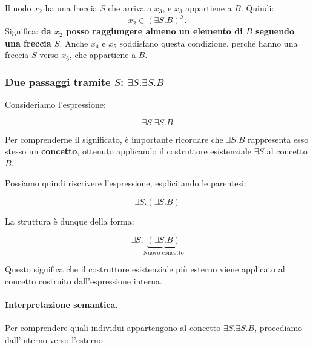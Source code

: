 Il nodo \(x_2\) ha una freccia \(S\) che arriva a \(x_3\), e \(x_3\)
appartiene a \(B\). Quindi:
\[
    x_2\in(\exists S.B)^{\mathcal I}.
\]
Significa: \textbf{da \(x_2\) posso raggiungere almeno un elemento di \(B\)
seguendo una freccia \(S\)}. Anche \(x_4\) e \(x_5\) soddisfano questa
condizione, perché hanno una freccia \(S\) verso \(x_6\), che appartiene a \(B\).

\subsubsection{Due passaggi tramite $S$: $\exists S.\exists S.B$}

Consideriamo l'espressione:

\[
\exists S.\exists S.B
\]

Per comprenderne il significato, è importante ricordare che
$\exists S.B$ rappresenta esso stesso un \textbf{concetto},
ottenuto applicando il costruttore esistenziale $\exists S$
al concetto $B$.

Possiamo quindi riscrivere l'espressione, esplicitando
le parentesi:

\[
\exists S.(\exists S.B)
\]

La struttura è dunque della forma:

\[
\exists S.\underbrace{(\exists S.B)}_{\text{Nuovo concetto}}
\]

Questo significa che il costruttore esistenziale più esterno
viene applicato al concetto costruito dall'espressione interna.

\paragraph{Interpretazione semantica.}

Per comprendere quali individui appartengono al concetto
$\exists S.\exists S.B$, procediamo dall'interno verso l'esterno.

